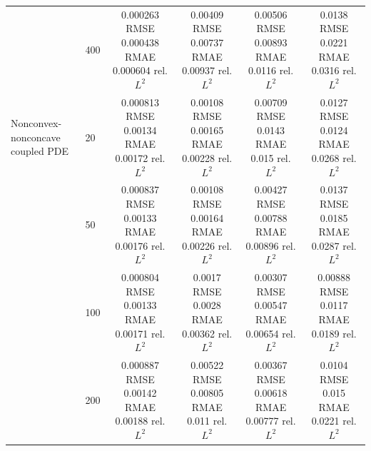 \begin{tabular}{llcccc}
 & 400 & \shortstack{0.000263 RMSE\\0.000438 RMAE\\0.000604 rel. $L^2$} & \shortstack{0.00409 RMSE\\0.00737 RMAE\\0.00937 rel. $L^2$} & \shortstack{0.00506 RMSE\\0.00893 RMAE\\0.0116 rel. $L^2$} & \shortstack{0.0138 RMSE\\0.0221 RMAE\\0.0316 rel. $L^2$} \\
\addlinespace
Nonconvex-nonconcave coupled PDE & 20 & \shortstack{0.000813 RMSE\\0.00134 RMAE\\0.00172 rel. $L^2$} & \shortstack{0.00108 RMSE\\0.00165 RMAE\\0.00228 rel. $L^2$} & \shortstack{0.00709 RMSE\\0.0143 RMAE\\0.015 rel. $L^2$} & \shortstack{0.0127 RMSE\\0.0124 RMAE\\0.0268 rel. $L^2$} \\
 & 50 & \shortstack{0.000837 RMSE\\0.00133 RMAE\\0.00176 rel. $L^2$} & \shortstack{0.00108 RMSE\\0.00164 RMAE\\0.00226 rel. $L^2$} & \shortstack{0.00427 RMSE\\0.00788 RMAE\\0.00896 rel. $L^2$} & \shortstack{0.0137 RMSE\\0.0185 RMAE\\0.0287 rel. $L^2$} \\
 & 100 & \shortstack{0.000804 RMSE\\0.00133 RMAE\\0.00171 rel. $L^2$} & \shortstack{0.0017 RMSE\\0.0028 RMAE\\0.00362 rel. $L^2$} & \shortstack{0.00307 RMSE\\0.00547 RMAE\\0.00654 rel. $L^2$} & \shortstack{0.00888 RMSE\\0.0117 RMAE\\0.0189 rel. $L^2$} \\
 & 200 & \shortstack{0.000887 RMSE\\0.00142 RMAE\\0.00188 rel. $L^2$} & \shortstack{0.00522 RMSE\\0.00805 RMAE\\0.011 rel. $L^2$} & \shortstack{0.00367 RMSE\\0.00618 RMAE\\0.00777 rel. $L^2$} & \shortstack{0.0104 RMSE\\0.015 RMAE\\0.0221 rel. $L^2$} \\

\end{tabular}
